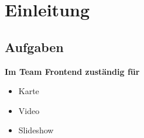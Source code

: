 \section{Einleitung} %
\subsection{Aufgaben} %

\begin{frame} %

\textbf{Im Team Frontend zuständig für}
\bigskip
	  \begin{itemize}
	   \item Karte
	   \item Video
	   \item Slideshow
	  \end{itemize}
\end{frame}
